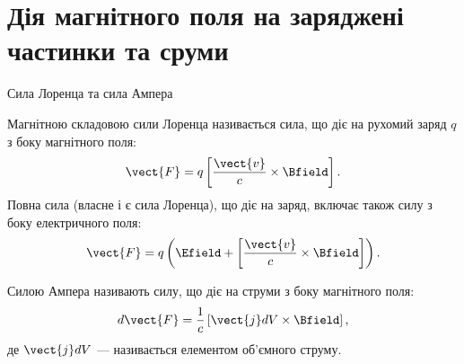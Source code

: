 \documentclass{beamer}
\begin{document}
\section{Дія магнітного поля на заряджені частинки та сруми}



\begin{frame}{Сила Лоренца та сила Ампера}{}
	\begin{block}{}
		Магнітною складовою сили Лоренца називається сила, що діє на рухомий заряд $q$ з
		боку магнітного поля:
		\begin{equation*}
			\vect{F} = q\left[\frac{\vect{v}}{c}\times\Bfield\right].
		\end{equation*}
		Повна сила (власне і є сила Лоренца), що діє на заряд, включає також силу з боку
		електричного поля:
		\begin{equation*}
			\vect{F} = q\left( \Efield + \left[\frac{\vect{v}}{c}\times\Bfield\right]
			\right) .
		\end{equation*}
	\end{block}
	\begin{block}{}
		\alert{Силою Ампера} називають силу, що діє на струми з боку магнітного поля:
		\begin{equation*}
			d\vect{F} = \frac1c \left[ \vect{j}dV \times \Bfield\right],
		\end{equation*}
		де $\vect{j} dV$ --- називається \alert{елементом об'ємного струму}.
	\end{block}
\end{frame}
\end{document}
